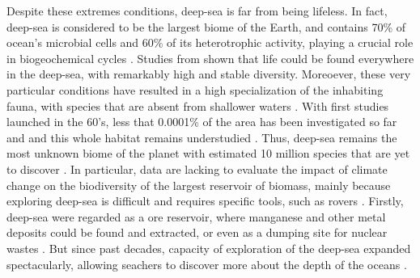 Despite these extremes conditions, deep-sea is far from being lifeless. In fact, deep-sea is considered to be the largest biome of the Earth, and contains 70\% of ocean's microbial cells and 60\% of its heterotrophic activity, playing a crucial role in biogeochemical cycles \citep{salazar2016}. Studies from \citet{grassle1992,parkes1994,todo2005} shown that life could be found everywhere in the deep-sea, with remarkably high and stable diversity. Moreoever, these very particular conditions have resulted in a high specialization of the inhabiting fauna, with species that are absent from shallower waters \citep{garcia2021}. With first studies launched in the 60's, less that 0.0001\% of the area has been investigated so far and and this whole habitat remains understudied \citep{danovaro2017,richards2019}. Thus, deep-sea remains the most unknown biome of the planet with estimated 10 million species that are yet to discover \citep{danovaro2017,grassle1992}. In particular, data are lacking to evaluate the impact of climate change on the biodiversity of the largest reservoir of biomass, mainly because exploring deep-sea is difficult and requires specific tools, such as rovers \citep{danovaro2008,danovaro2014}. Firstly, deep-sea were regarded as a ore reservoir, where manganese and other metal deposits could be found and extracted, or even as a dumping site for nuclear wastes \citep{baker2020,gillet2013,halfar2002}. But since past decades, capacity of exploration of the deep-sea expanded spectacularly, allowing seachers to discover more about the depth of the oceans \citep{danovaro2014}.

